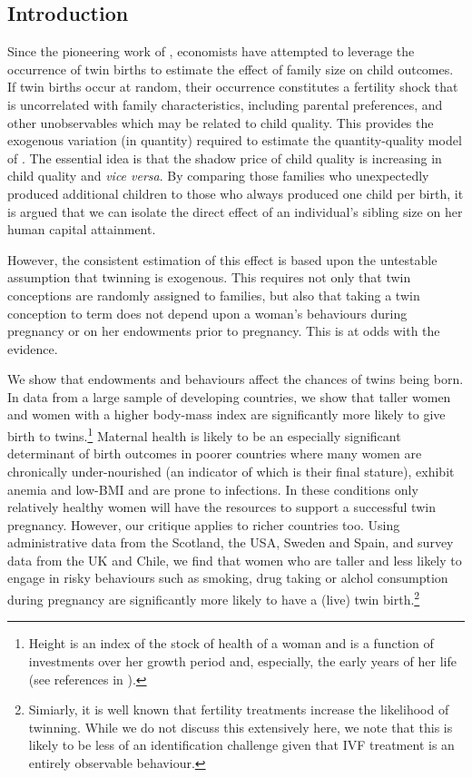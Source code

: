 \documentclass[subeqn]{article}
\begin{document}
\begin{spacing}{1.4}
\section{Introduction}                             \label{TWINscn:intro}
Since the pioneering work of \citet{RosenzweigWolpin1980}, economists have 
attempted to leverage the occurrence of twin births to estimate the effect of 
family size on child outcomes. If twin births occur at random, their occurrence 
constitutes a fertility shock that is uncorrelated with family characteristics, 
including parental preferences, and other unobservables which may be related to 
child quality. This provides the exogenous variation (in quantity) required to 
estimate the quantity-quality model of \citet{Becker1960,BeckerLewis1973,
BeckerTomes1976}.  The essential idea is that the shadow price of child quality 
is increasing in child quality and \emph{vice versa}.  By comparing those 
families who unexpectedly produced additional children to those who always 
produced one child per birth, it is argued that we can isolate the direct effect 
of an individual's sibling size on her human capital attainment.

However, the consistent estimation of this effect is based upon the untestable 
assumption that twinning is exogenous. This requires not only that twin conceptions 
are randomly assigned to families, but also that taking a twin conception to term 
does not depend upon a woman's behaviours during pregnancy or on her endowments
prior to pregnancy. This is at odds with the evidence.

We show that endowments and behaviours affect the chances of twins being born. 
In data from a large sample of developing countries, we show that taller women 
and women with a higher body-mass index are significantly more likely to give 
birth to twins.\footnote{Height is an index of the stock of health of a woman 
and is a function of investments over her growth period and, especially, the 
early years of her life (see references in \citet{BhalotraRawlings2013}).} 
Maternal health is likely to be an especially significant determinant of birth 
outcomes in poorer countries where many women are chronically under-nourished 
(an indicator of which is their final stature), exhibit anemia and low-BMI and 
are prone to infections. In these conditions only relatively healthy women will 
have the resources to support a successful twin pregnancy. However, our critique 
applies to richer countries too. Using administrative data from the Scotland,
the USA, Sweden and Spain, and survey data from the UK and Chile, we find that 
women who are taller and less likely to engage in risky behaviours such as 
smoking, drug taking or alchol consumption during pregnancy are significantly 
more likely to have a (live) twin birth.\footnote{Simiarly, it is well known 
that fertility treatments increase the likelihood of twinning. While we do not 
discuss this extensively here, we note that this is likely to be less of an 
identification challenge given that IVF treatment is an entirely observable 
behaviour.}


\end{spacing}
\end{document}
